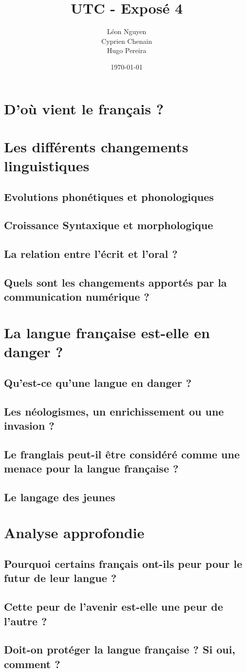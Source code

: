 \documentclass[a4paper,12pt]{article}
\title{UTC - Exposé 4}
\author{Léon Nguyen \\ Cyprien Chenain \\ Hugo Pereira}
\date{\today}
\begin{document}
    \titrearticle

    \tableofcontents %

    \section{D'où vient le français ?}

    \section{Les différents changements linguistiques}
    \subsection{Evolutions phonétiques et phonologiques}
    \subsection{Croissance Syntaxique et morphologique}
    \subsection{La relation entre l'écrit et l'oral ?}
    \subsection{Quels sont les changements apportés par la communication numérique ?}

    \section{La langue française est-elle en danger ?}
    \subsection{Qu'est-ce qu'une langue en danger ?}
    \subsection{Les néologismes, un enrichissement ou une invasion ?}
    \subsection{Le franglais peut-il être considéré comme une menace pour la langue française ?}
    \subsection{Le langage des jeunes}

    \section{Analyse approfondie}
    \subsection{Pourquoi certains français ont-ils peur pour le futur de leur langue ?}
    \subsection{Cette peur de l'avenir est-elle une peur de l'autre ?}
    \subsection{Doit-on protéger la langue française ? Si oui, comment ?}
\end{document}
